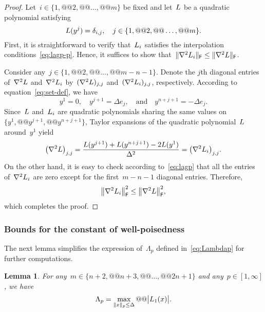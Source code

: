 \documentclass{article}
\theoremstyle{definition}
\theoremstyle{plain}
\newtheorem{lemma}{Lemma}[section]
\theoremstyle{remark}
\newcommand*{\abs}[2][]{#1\lvert#2#1\rvert}
\newcommand*{\norm}[2][]{#1\lVert#2#1\rVert}
\newcommand*{\set}[2][]{#1\{#2#1\}}
\newcommand*{\lagp}[1][]{L\ifblank{#1}{}{_{#1}}}
\begin{document}
\begin{proof}
    Let~$i \in \set{1, @@ 2, @@ \dots, @@ m}$ be fixed and let~$\lagp$ be a quadratic polynomial satisfying
    \begin{equation}
        \label{eq:lagp-p}
        \lagp(y^j) = \delta_{i, j}, \quad j \in \set{1, @@ 2, @@ \dots, @@ m}.
    \end{equation}
    First, it is straightforward to verify that~$\lagp[i]$ satisfies the interpolation conditions~\eqref{eq:lagp-p}.
    Hence, it suffices to show that~$\norm{\nabla^2 \lagp[i]}_\mathsf{F} \le \norm{\nabla^2 \lagp}_\mathsf{F}$.

    Consider any~$j \in \set{1, @@ 2, @@ \dots, @@ m - n - 1}$.
    Denote the $j$th diagonal entries of~$\nabla^2 \lagp$ and~$\nabla^2 \lagp[i]$ by~$(\nabla^2 \lagp)_{j, j}$ and~$(\nabla^2 \lagp[i])_{j, j}$, respectively.
    According to equation~\eqref{eq:set-def}, we have
    \begin{equation*}
        y^1 = 0, \quad y^{j + 1} = \Delta e_j, \quad \text{and} \quad y^{n + j + 1} = -\Delta e_j.
    \end{equation*}
    Since~$\lagp$ and~$\lagp[i]$ are quadratic polynomials sharing the same values on~$\set{y^1, @@ y^{j + 1}, @@ y^{n + j + 1}}$, Taylor expansions of the quadratic polynomial~$\lagp$ around~$y^1$ yield
    \begin{equation*}
        \big(\nabla^2 \lagp \big)_{j, j} = \frac{\lagp(y^{j + 1}) + \lagp(y^{n + j + 1}) - 2 \lagp(y^1)}{\Delta^2} = \big(\nabla^2 \lagp[i] \big)_{j, j}.
    \end{equation*}
    On the other hand, it is easy to check according to~\eqref{eq:lagp} that all the entries of~$\nabla^2 \lagp[i]$ are zero except for the first~$m-n-1$ diagonal entries.
    Therefore,
    \begin{equation*}
        \norm[\big]{\nabla^2 \lagp[i]}_{\mathsf{F}}^2 \le \norm[\big]{\nabla^2 \lagp}_{\mathsf{F}}^2,
    \end{equation*}
    which completes the proof.
\end{proof}

\subsubsection{Bounds for the constant of well-poisedness}

The next lemma simplifies the expression of~$\Lambda_p$ defined in~\eqref{eq:Lambdap} for further computations.

\begin{lemma}
    \label{lem:lambda-p}
    For any~$m \in \set{n + 2, @@ n + 3, @@ \dots, @@ 2n + 1}$ and any~$p \in [1, \infty]$, we have
    \begin{equation}
        \label{eq:lambda-p}
        \Lambda_p = \max_{\norm{x}_p \le \Delta} @@ \abs[\big]{\lagp[1](x)}.
    \end{equation}
\end{lemma}
\end{document}
